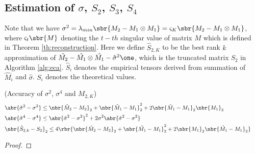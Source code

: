 \documentclass[twoside,11pt]{article}
\begin{document}
{\subsection{Estimation of $\sigma$, $S_2$, $S_3$, $S_4$}
 Note that we have $\sigma^2  = \lambda_{min}\sbr{{M_2} - {M_1} \otimes {M_1}} =
\varsigma_K{\sbr{{M_2} - {M_1} \otimes {M_1}}}$, where $\varsigma_t \sbr{M}$ denoting the $t-th$ singular value of matrix $M$ which is defined in Theorem \ref{th:reconstruction}. Here we define $\hat{S}_{2,K}$ to be the best rank $k$ approximation of $ \hat{M_2} - \hat{M_1} \otimes \hat{M_1} - \hat{\sigma}^2\one$, which is the truncated matrix $S_2$ in Algorithm \ref{alg:eca}. $\hat{S}_i$ denotes the empirical tensors derived from summation of $\hat{M}_i$ and $\hat{\sigma}$. $S_i$ denotes the theoretical values.
\begin{lemma}{(Accuracy of $\sigma^2$, $\sigma^4$ and $M_{2,K}$)}
  \label{lem:sigbounds}
  \begin{align}
    &\abr{\hat{\sigma}^2 - \sigma^2 }  \leq \nbr{\hat{M}_2-M_2}_2 +   \nbr{\hat{M}_1-M_1}_2^2+2\nbr{\hat{M}_1-M_1}_2\nbr{M_1}_2\\
    &\abr{\hat{\sigma}^4 -  \sigma^4}  \leq \abr{ \hat{\sigma}^2 - \sigma^2 }^2 + 2 \sigma^2 \abr{\hat{\sigma}^2 - \sigma^2}\\
    &\nbr{\hat{S}_{2,k}-S_2}_2 \leq 4 \rbr{\nbr{\hat{M}_2 - M_2}_2 + \nbr{\hat{M_1}-M_1}_2^2 + 2\nbr{M_1}_2 \nbr{\hat{M_1}-M_1}_2}
  \end{align}
\end{lemma}

\begin{proof}


\end{proof}}
\end{document}
